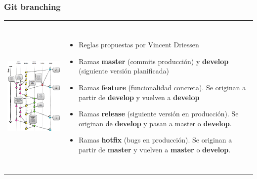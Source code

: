 \frame
{
\frametitle{Git branching}

\begin{tabular}[t]{m{5cm}m{6cm}}
   \includegraphics[height=8cm]{imgs/gitbranching.png} 
   &
   \begin{itemize}
    \addtolength{\itemindent}{0.4cm}
    \item Reglas propuestas por Vincent Driessen
    \item Ramas \textbf{master} (commits producción) y \textbf{develop} (siguiente versión planificada)
    \item Ramas \textbf{feature} (funcionalidad concreta). Se originan a partir de \textbf{develop} y vuelven a \textbf{develop}
    \item Ramas \textbf{release} (siguiente versión en producción). Se originan de \textbf{develop} y pasan a master o \textbf{develop}.
    \item Ramas \textbf{hotfix} (bugs en producción). Se originan a partir de \textbf{master} y vuelven a \textbf{master} o \textbf{develop}.
   \end{itemize}
\end{tabular}
}